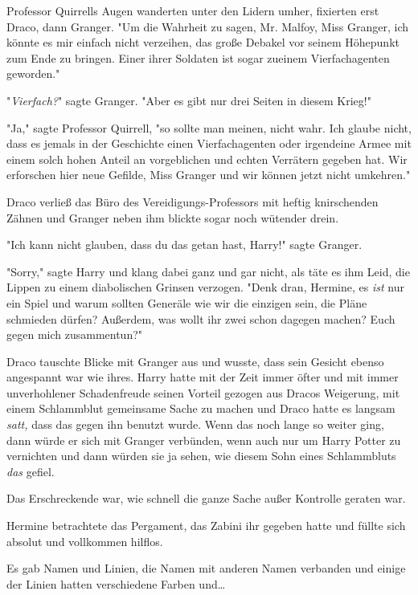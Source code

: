 {Professor Quirrells Augen wanderten unter den Lidern umher, fixierten erst Draco, dann Granger. "Um die Wahrheit zu sagen, Mr. Malfoy, Miss Granger, ich könnte es mir einfach nicht verzeihen, das große Debakel vor seinem Höhepunkt zum Ende zu bringen. Einer ihrer Soldaten ist sogar zueinem Vierfachagenten geworden."

"\emph{Vierfach?}" sagte Granger. "Aber es gibt nur drei Seiten in diesem Krieg!"

"Ja," sagte Professor Quirrell, "so sollte man meinen, nicht wahr. Ich glaube nicht, dass es jemals in der Geschichte einen Vierfachagenten oder irgendeine Armee mit einem solch hohen Anteil an vorgeblichen und echten Verrätern gegeben hat. Wir erforschen hier neue Gefilde, Miss Granger und wir können jetzt nicht umkehren."

Draco verließ das Büro des Vereidigungs-Professors mit heftig knirschenden Zähnen und Granger neben ihm blickte sogar noch wütender drein.

"Ich kann nicht glauben, dass du das getan hast, Harry!" sagte Granger.

"Sorry," sagte Harry und klang dabei ganz und gar nicht, als täte es ihm Leid, die Lippen zu einem diabolischen Grinsen verzogen. "Denk dran, Hermine, es \emph{ist} nur ein Spiel und warum sollten Generäle wie wir die einzigen sein, die Pläne schmieden dürfen? Außerdem, was wollt ihr zwei schon dagegen machen? Euch gegen mich zusammentun?"

Draco tauschte Blicke mit Granger aus und wusste, dass sein Gesicht ebenso angespannt war wie ihres. Harry hatte mit der Zeit immer öfter und mit immer unverhohlener Schadenfreude seinen Vorteil gezogen aus Dracos Weigerung, mit einem Schlammblut gemeinsame Sache zu machen und Draco hatte es langsam \emph{satt,} dass das gegen ihn benutzt wurde. Wenn das noch lange so weiter ging, dann würde er sich mit Granger verbünden, wenn auch nur um Harry Potter zu vernichten und dann würden sie ja sehen, wie diesem Sohn eines Schlammbluts \emph{das} gefiel.

\later

Das Erschreckende war, wie schnell die ganze Sache außer Kontrolle geraten war.

Hermine betrachtete das Pergament, das Zabini ihr gegeben hatte und füllte sich absolut und vollkommen hilflos.

Es gab Namen und Linien, die Namen mit anderen Namen verbanden und einige der Linien hatten verschiedene Farben und…

}
